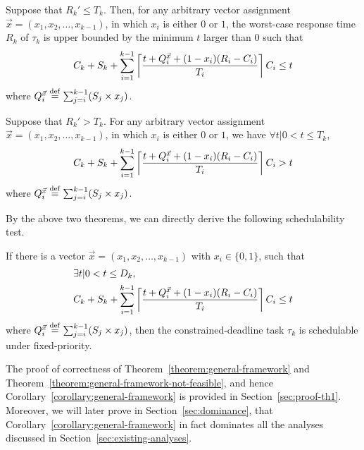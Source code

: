 \begin{theorem}
   \label{theorem:general-framework}
   Suppose that $R_k' \leq T_k$. Then, for any arbitrary vector assignment $\vec{x} = (x_1, x_2, \ldots, x_{k-1})$, in which $x_i$ is either $0$ or $1$, the worst-case
   response time $R_k$ of $\tau_k$ is upper bounded by the minimum $t$ larger than $0$ such that 
   {\small \begin{equation} \label{eq:TDA-suspension-tighter0} 
       C_k + S_k + \sum_{i=1}^{k-1}\ceiling{\frac{t+Q_i^{\vec{x}}+(1-x_i)(R_i-C_i)}{T_i}} C_i \leq t
     \end{equation}}where $Q_i^{\vec{x}} \stackrel{\mathrm{def}}{=} \sum_{j=i}^{k-1} (S_j \times x_j)$.
 \end{theorem} 
\begin{theorem}
   \label{theorem:general-framework-not-feasible}
   Suppose that $R_k' > T_k$. For any arbitrary vector assignment
   $\vec{x} = (x_1, x_2, \ldots, x_{k-1})$, in which $x_i$ is either
   $0$ or $1$,  we have $\forall t | 0 < t \leq T_k$,
   {\small \begin{equation*}
       C_k + S_k + \sum_{i=1}^{k-1}\left\lceil{\frac{t+Q_i^{\vec{x}}+(1-x_i)(R_i-C_i)}{T_i}}\right\rceil C_i > t
     \end{equation*}}where $Q_i^{\vec{x}} \stackrel{\mathrm{def}}{=} \sum_{j=i}^{k-1} (S_j \times x_j)$.
 \end{theorem} 
By the above two theorems, we can directly derive the
following schedulability test.

 \begin{Corollary}
   \label{corollary:general-framework}
   If there is a vector $\vec{x} = (x_1, x_2, \ldots,
   x_{k-1})$ with $x_i \in \{ 0, 1\}$, such that 
   {\small \begin{align} 
   \label{eq:TDA-suspension-tighter} 
       & \exists t | 0 < t \leq D_k,  \nonumber \\
       & C_k + S_k + \sum_{i=1}^{k-1}\ceiling{\frac{t+Q_i^{\vec{x}}+(1-x_i)(R_i-C_i)}{T_i}} C_i \leq t
     \end{align}}
     where $Q_i^{\vec{x}} \stackrel{\mathrm{def}}{=} \sum_{j=i}^{k-1} (S_j \times x_j)$, then the constrained-deadline task $\tau_k$ is schedulable under fixed-priority.
 \end{Corollary}
 
  The proof of correctness of Theorem~\ref{theorem:general-framework}
  and Theorem~\ref{theorem:general-framework-not-feasible}, and hence Corollary~\ref{corollary:general-framework} is provided in Section~\ref{sec:proof-th1}. Moreover, we will later prove in Section~\ref{sec:dominance}, that Corollary~\ref{corollary:general-framework} in fact dominates all the analyses discussed in Section~\ref{sec:existing-analyses}.
 
